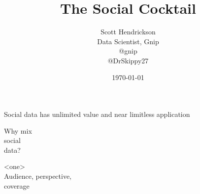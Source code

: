 \documentclass{beamer}
\begin{document}
\title{The Social Cocktail}  
\author{Scott Hendrickson \\ Data Scientist, Gnip\\ [10pt] @gnip \\ @DrSkippy27}
\date{\today} 


\begin{frame}
\titlepage
\end{frame}




\begin{frame}
\begin{center}
\Huge Social data has unlimited value and near limitless application
\end{center}
\end{frame}

%


\begin{frame}
\begin{center}
{\Huge Why mix \\ [5pt] social  \\ [15pt] data? }
\end{center}
\end{frame}


\begin{frame}
\begin{center}
{\Huge <one> \\ [15pt]  Audience, perspective, \\  [15pt] coverage }
\end{center}
\end{frame}
\end{document}
